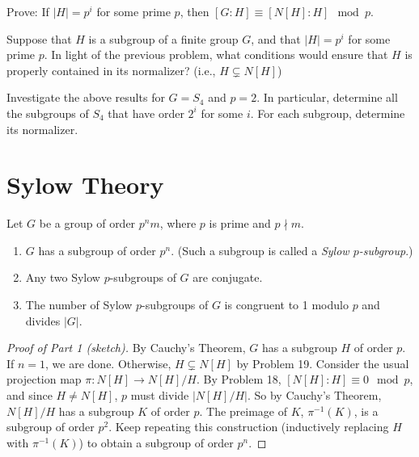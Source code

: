 \begin{problem}
Prove: If $\lvert H \rvert = p^i$ for some prime $p$, then $[G:H] \equiv [N[H]:H] \mod p$.
\end{problem}



\begin{problem}
Suppose that $H$ is a subgroup of a finite group $G$, and that $\lvert H \rvert = p^i$ for some prime $p$. In light of the previous problem, what conditions would ensure that $H$ is properly contained in its normalizer? (i.e., $H \subsetneq N[H]$)
\end{problem}



\begin{problem}
Investigate the above results for $G = S_4$ and $p = 2$.  In particular, determine all the subgroups of $S_4$ that have order $2^i$ for some $i$.  For each subgroup, determine its normalizer.
\end{problem}


\section{Sylow Theory}

\begin{theorem}\label{thm:sylow}
 Let $G$ be a group of order $p^nm$, where $p$ is prime and $p \nmid m$.
 \begin{enumerate}
  \item $G$ has a subgroup of order $p^n$. (Such a subgroup is called a \emph{Sylow $p$-subgroup}.)
  \item Any two Sylow $p$-subgroups of $G$ are conjugate.
  \item The number of Sylow $p$-subgroups of $G$ is congruent to 1 modulo $p$ and divides $\lvert G \rvert$.
 \end{enumerate}
\end{theorem}

\begin{proof}[Proof of Part 1 (sketch)]
 By Cauchy's Theorem, $G$ has a subgroup $H$ of order $p$. If $n=1$, we are done. Otherwise, $H \subsetneq N[H]$ by Problem 19. Consider the usual projection map $\pi:N[H]\longrightarrow N[H]/H$. By Problem 18, $[N[H]:H] \equiv 0 \mod p$, and since $H \neq N[H]$, $p$ must divide $\lvert N[H]/H \rvert$. So by Cauchy's Theorem, $N[H]/H$ has a subgroup $K$ of order $p$. The preimage of $K$, $\pi^{-1}(K)$, is a subgroup of order $p^2$. Keep repeating this construction (inductively replacing $H$ with $\pi^{-1}(K)$) to obtain a subgroup of order $p^n$.
\end{proof}

